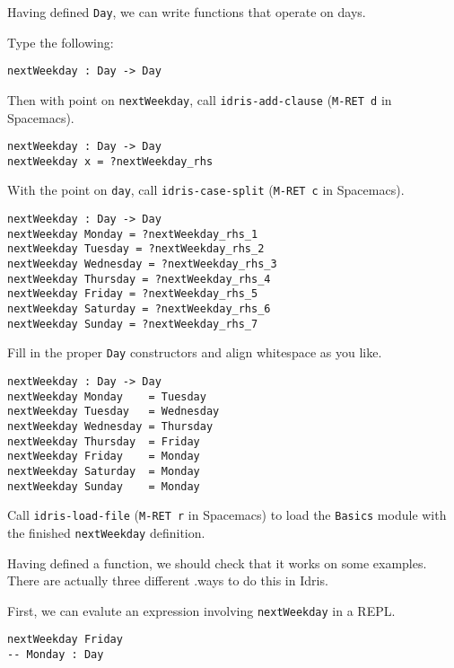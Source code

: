\documentclass[b5paper,twoside]{amsbook}
\begin{document}
Having defined \texttt{Day}, we can write functions that
operate on days.

Type the following:

\begin{verbatim}
nextWeekday : Day -> Day
\end{verbatim}

Then with point on \texttt{nextWeekday}, call
\texttt{idris-add-clause} (\texttt{M-RET d} in
Spacemacs).

\begin{verbatim}
nextWeekday : Day -> Day
nextWeekday x = ?nextWeekday_rhs
\end{verbatim}

With the point on \texttt{day}, call
\texttt{idris-case-split} (\texttt{M-RET c} in
Spacemacs).

\begin{verbatim}
nextWeekday : Day -> Day
nextWeekday Monday = ?nextWeekday_rhs_1
nextWeekday Tuesday = ?nextWeekday_rhs_2
nextWeekday Wednesday = ?nextWeekday_rhs_3
nextWeekday Thursday = ?nextWeekday_rhs_4
nextWeekday Friday = ?nextWeekday_rhs_5
nextWeekday Saturday = ?nextWeekday_rhs_6
nextWeekday Sunday = ?nextWeekday_rhs_7
\end{verbatim}

Fill in the proper \texttt{Day} constructors and align
whitespace as you like.

\begin{verbatim}
nextWeekday : Day -> Day
nextWeekday Monday    = Tuesday
nextWeekday Tuesday   = Wednesday
nextWeekday Wednesday = Thursday
nextWeekday Thursday  = Friday
nextWeekday Friday    = Monday
nextWeekday Saturday  = Monday
nextWeekday Sunday    = Monday
\end{verbatim}

Call \texttt{idris-load-file}
(\texttt{M-RET r} in Spacemacs) to load the
\texttt{Basics} module with the finished
\texttt{nextWeekday} definition.

Having defined a function, we should check that it works on some
examples. There are actually three different .ways to do this in Idris.

First, we can evalute an expression involving
\texttt{nextWeekday} in a REPL.

\begin{verbatim}
nextWeekday Friday
-- Monday : Day
\end{verbatim}
\end{document}
